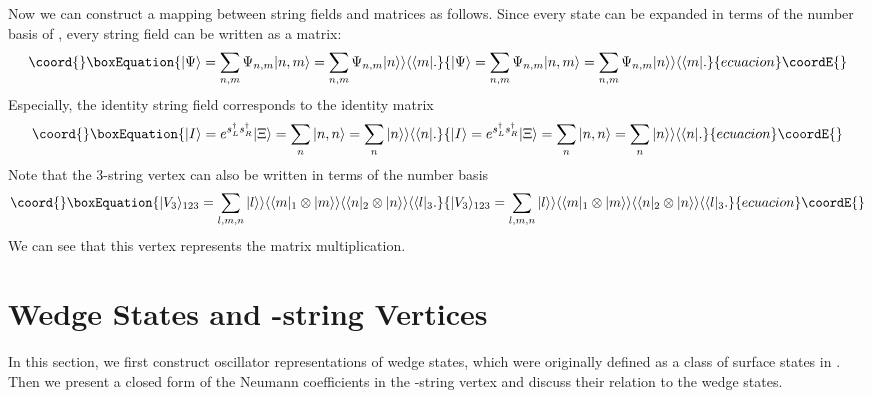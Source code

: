 \documentclass[a4paper,12pt]{article}
\def\ket{\rangle}
\def\tens{\otimes}
\def\sd{s^{\dagger}}
\providecommand{\kket}{\rangle\rangle}
\providecommand{\bbra}{\langle\langle}
\begin{document}
Now we can construct a mapping between string fields and matrices
as follows.
Since every state can be expanded in terms of the number basis of
\coordHE{},  every string field can be written as a matrix:
\begin{equation}\coord{}\boxEquation{
 |\Psi\ket=\sum_{n,m}\Psi_{n,m}|n,m\ket=\sum_{n,m}\Psi_{n,m}|n\kket\bbra m|.
}{
 |\Psi\ket=\sum_{n,m}\Psi_{n,m}|n,m\ket=\sum_{n,m}\Psi_{n,m}|n\kket\bbra m|.
}{ecuacion}\coordE{}\end{equation}
Especially, the identity string field corresponds to the identity matrix
\begin{equation}\coord{}\boxEquation{
 |I\ket=e^{\sd_L\sd_R}|\Xi\ket=\sum_n|n,n\ket=\sum_n|n\kket\bbra n|.
}{
 |I\ket=e^{\sd_L\sd_R}|\Xi\ket=\sum_n|n,n\ket=\sum_n|n\kket\bbra n|.
}{ecuacion}\coordE{}\end{equation}
Note that the 3-string vertex can also be written in terms of the number basis
\begin{equation}\coord{}\boxEquation{
 |V_3\ket_{123}=\sum_{l,m,n}|l\kket\bbra m|_1\tens |m\kket\bbra n|_2\tens
|n\kket\bbra l|_3.
}{
 |V_3\ket_{123}=\sum_{l,m,n}|l\kket\bbra m|_1\tens |m\kket\bbra n|_2\tens
|n\kket\bbra l|_3.
}{ecuacion}\coordE{}\end{equation}
We can see that this vertex represents the matrix multiplication. 




\section{Wedge States and \coordHE{}-string Vertices}
In this section, we first construct oscillator 
representations of wedge states, which were originally
defined as a class of surface states in \cite{RZ}. 
Then we present a closed form of
the Neumann coefficients in the \coordHE{}-string vertex and 
discuss their relation to the wedge states.  
\end{document}
